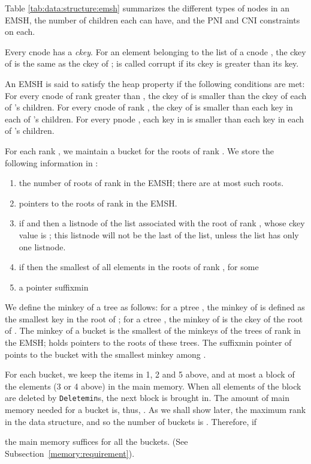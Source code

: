 Table \ref{tab:data:structure:emsh} summarizes the different types of nodes in an EMSH, 
the number of children each can have, and the PNI and CNI constraints on each.

Every cnode has a {\em ckey}.
For an element  belonging to the list of a cnode ,
	the ckey of  is the same as the ckey of ; 
	 is called corrupt if its ckey
	is greater than its key.

An EMSH is said to satisfy the heap property if the following
	conditions are met:
For every cnode  of rank greater than , the ckey of  is smaller than 
	the ckey of each of 's children.
For every cnode  of rank , the ckey of  is smaller than
	each key in each of 's children.
For every pnode , each key in  is smaller than each key in each of 's
	children.

For each rank , we maintain a bucket  for the roots of rank . 
We store the following information in :
\begin{enumerate}
\item the number of roots of rank  in the EMSH; there are at most  such roots.
\item pointers to the roots of rank  in the EMSH.
\item if  and 
	then a listnode of the list associated with the root of rank , whose ckey value is ;
	this listnode will not be the last of the list, unless the list has only one listnode. 
\item if  then the  smallest of all elements in the roots of rank , 
	for some 
\item a pointer suffixmin
\end{enumerate}

We define the minkey of a tree as follows:
for a ptree , the minkey of  is defined as the 
	smallest key in the root of ;
for a ctree , the minkey of  is the ckey of the root of .
The minkey of a bucket  is the smallest of the minkeys of the trees of rank  in the EMSH;
	 holds pointers to the roots of these trees.  
The suffixmin pointer of  points to the bucket with the smallest minkey
	among .  

For each bucket, we keep the items in 1, 2 and 5 above, and at most a block of the elements 
	(3 or 4 above) in the main memory.
When all elements of the block are deleted by {\tt Deletemin}s, the next 
	block is brought in.
The amount of main memory needed for a bucket is, thus, . 
As we shall show later, the maximum rank in the data structure, and so the number
	of buckets is . Therefore, if 
	 
	the main memory suffices for all the buckets.
(See Subsection~\ref{memory:requirement}). 

